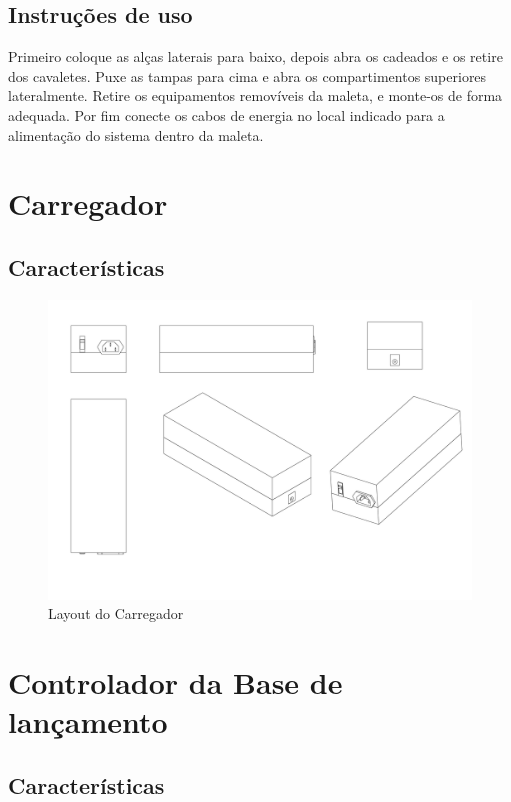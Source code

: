 \subsection*{Instruções de uso}

\par Primeiro coloque as alças laterais para baixo, depois abra os cadeados e os retire dos cavaletes. Puxe as tampas para cima e abra os compartimentos superiores lateralmente. Retire os equipamentos removíveis da maleta, e monte-os de forma adequada. Por fim conecte os cabos de energia no local indicado para a alimentação do sistema dentro da maleta.

\section*{Carregador}

\subsection*{Características}

\begin{figure}[H]
  \centering
  \includegraphics[scale=0.2]{Figuras/Vistas_carregador.pdf}
  \caption{Layout do Carregador}
  \label{fig:suporte_explode}
\end{figure}

\section*{Controlador da Base de lançamento}

\subsection*{Características}

